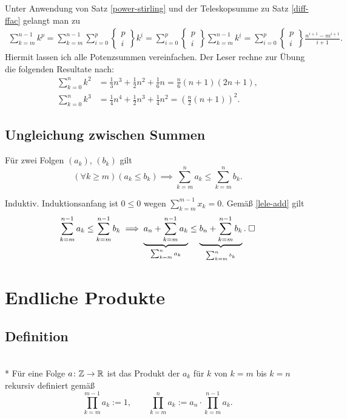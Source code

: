 Unter Anwendung von Satz \ref{power-stirling}
und der Teleskopsumme zu Satz \ref{diff-ffac} gelangt man zu
\begin{gather*}
\sum_{k=m}^{n-1} k^p = \sum_{k=m}^{n-1} \sum_{i=0}^p
\begin{Bmatrix}p\\ i\end{Bmatrix}k^{\underline i}
= \sum_{i=0}^p \begin{Bmatrix}p\\ i\end{Bmatrix}\sum_{k=m}^{n-1}
k^{\underline i}
= \sum_{i=0}^p \begin{Bmatrix}p\\ i\end{Bmatrix}
\frac{n^{\underline{i+1}}-m^{\underline{i+1}}}{i+1}.
\end{gather*}
Hiermit lassen ich alle Potenzsummen vereinfachen. Der Leser
rechne zur Übung die folgenden Resultate nach:
\begin{align}
\sum_{k=0}^n k^2 &= \tfrac{1}{3}n^3+\tfrac{1}{2}n^2+\tfrac{1}{6}n
= \tfrac{n}{6}(n+1)(2n+1),\\
\sum_{k=0}^n k^3 &= \tfrac{1}{4}n^4+\tfrac{1}{2}n^3+\tfrac{1}{4}n^2
= (\tfrac{n}{2}(n+1))^2.
\end{align}

\subsection{Ungleichung zwischen Summen}

\begin{Korollar}
Für zwei Folgen $(a_k)$, $(b_k)$ gilt
\[(\forall k\ge m)(a_k\le b_k)\implies\sum_{k=m}^n a_k \le \sum_{k=m}^n b_k.\]
\end{Korollar}
 Induktiv. Induktionsanfang ist $0\le 0$ wegen $\sum_{k=m}^{m-1} x_k=0$.
Gemäß \eqref{lele-add} gilt
\[\sum_{k=m}^{n-1} a_k\le\sum_{k=m}^{n-1} b_k
\implies \underbrace{a_n+\sum_{k=m}^{n-1} a_k}_{\sum_{k=m}^n a_k}
\le \underbrace{b_n+\sum_{k=m}^{n-1} b_k}_{_{\sum_{k=m}^n b_k}}.\;\Box\]


\newpage
\section{Endliche Produkte}

\subsection{Definition}
\begin{Definition}[Produkt]\mbox{}\\*
Für eine Folge $a\colon\mathbb Z\to\mathbb R$ ist das Produkt der $a_k$ für
$k$ von $k=m$ bis $k=n$ rekursiv definiert gemäß%
\[\prod_{k=m}^{m-1} a_k := 1,\qquad
\prod_{k=m}^n a_k := a_n\cdot\prod_{k=m}^{n-1} a_k.\]
\end{Definition}

